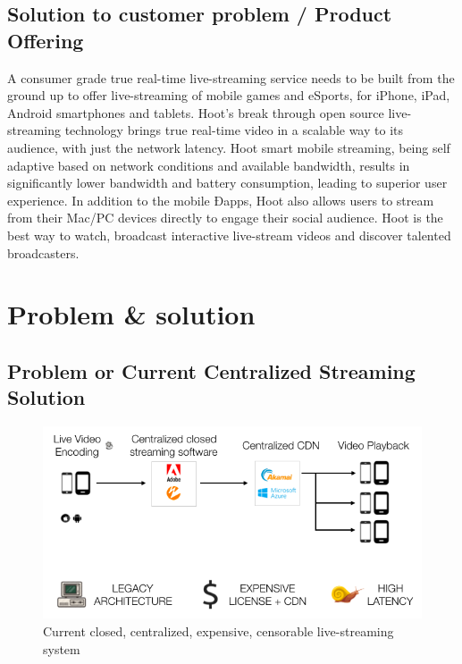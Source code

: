 \documentclass{article}
\begin{document}
\subsection{Solution to customer problem / Product Offering}
A consumer grade true real-time live-streaming service needs to be built from the ground up to offer live-streaming of mobile games and eSports, for iPhone, iPad, Android smartphones and tablets. Hoot's break through open source live-streaming technology brings true real-time video in a scalable way to its audience, with just the network latency. Hoot smart mobile streaming, being self adaptive based on network conditions and available bandwidth, results in significantly lower bandwidth and battery consumption, leading to superior user experience. In addition to the mobile Ðapps, Hoot also allows users to stream from their Mac/PC devices directly to engage their social audience. Hoot is the best way to watch, broadcast interactive live-stream videos and discover talented broadcasters.

%
\fi
\section{Problem \& solution}

\subsection{Problem or Current Centralized Streaming Solution}

\begin{figure}[h!]
 \centering
 \includegraphics[width=1.0\textwidth]{static/problem-architecture-trans}
 \caption{Current closed, centralized, expensive, censorable live-streaming system}
 \label{image:problem-architecture-trans}
\end{figure}
\end{document}
